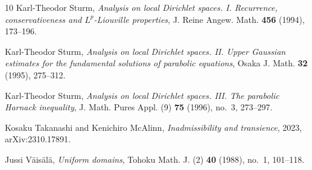 \documentclass[11pt]{amsart}
\theoremstyle{plain}
\theoremstyle{definition}
\theoremstyle{remark}
\begin{document}
{\begin{thebibliography}{10}
Karl-Theodor Sturm, \emph{Analysis on local {D}irichlet spaces. {I}.
  {R}ecurrence, conservativeness and {$L^p$}-{L}iouville properties}, J. Reine
  Angew. Math. \textbf{456} (1994), 173--196.

Karl-Theodor Sturm, \emph{Analysis on local {D}irichlet spaces. {II}. {U}pper
  {G}aussian estimates for the fundamental solutions of parabolic equations},
  Osaka J. Math. \textbf{32} (1995), 275--312.

Karl-Theodor Sturm, \emph{Analysis on local {D}irichlet spaces. {III}. {T}he
  parabolic {H}arnack inequality}, J. Math. Pures Appl. (9) \textbf{75} (1996),
  no.~3, 273--297.

Kosaku Takanashi and Kenichiro McAlinn, \emph{Inadmissibility and transience},
  2023, arXiv:2310.17891.

Jussi V{\"a}is{\"a}l{\"a}, \emph{Uniform domains}, Tohoku Math. J. (2)
  \textbf{40} (1988), no.~1, 101--118.

\end{thebibliography}
}
\end{document}
